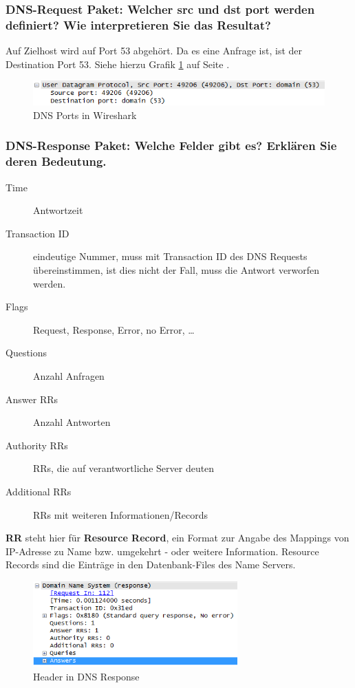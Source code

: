 \documentclass[11pt,a4paper]{scrartcl}
\begin{document}
\subsubsection{DNS-Request Paket: Welcher src und dst port werden definiert? Wie interpretieren Sie das Resultat?}
Auf Zielhost wird auf Port 53 abgehört. Da es eine Anfrage ist, ist der Destination Port 53. Siehe hierzu Grafik \ref{fig:dns_2_2_2} auf Seite \pageref{fig:dns_2_2_2}.
\begin{figure}[h]
	\centering
	\includegraphics[width=1.0\textwidth]{../aufg2/dns_2_2_2.png}
	\caption{DNS Ports in Wireshark}
	\label{fig:dns_2_2_2}
\end{figure}

\subsubsection{DNS-Response Paket: Welche Felder gibt es? Erklären Sie deren Bedeutung.}
\begin{description}
	\item[Time] Antwortzeit
	\item[Transaction ID] eindeutige Nummer, muss mit Transaction ID des DNS Requests übereinstimmen, ist dies nicht der Fall, muss die Antwort verworfen werden.
	\item[Flags] Request, Response, Error, no Error, \ldots
	\item[Questions] Anzahl Anfragen
	\item[Answer RRs] Anzahl Antworten
	\item[Authority RRs] RRs, die auf verantwortliche Server deuten
	\item[Additional RRs] RRs mit weiteren Informationen/Records
\end{description}
\textbf{RR} steht hier für \textbf{Resource Record}, ein Format zur Angabe des Mappings von IP-Adresse zu Name bzw. umgekehrt - oder weitere Information. Resource Records sind die Einträge in den Datenbank-Files des Name Servers.
\begin{figure}[h]
	\centering
	\includegraphics[width=0.7\textwidth]{../aufg2/dns_2_2_3.png}
	\caption{Header in DNS Response}
	\label{fig:dns_2_2_3}
\end{figure}
\end{document}
